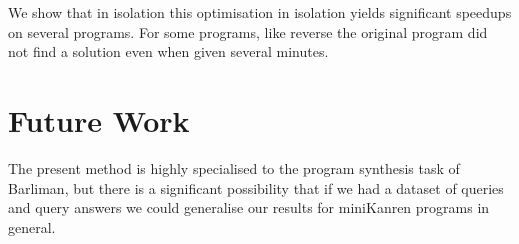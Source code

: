 \documentclass[submission,copyright,creativecommons]{eptcs}
\begin{document}
We show that in isolation this optimisation in isolation yields
significant speedups on several programs. For some programs, like
reverse the original program did not find a solution even when given
several minutes.

\section{Future Work}

The present method is highly specialised to the program synthesis task
of Barliman, but there is a significant possibility that if we had a
dataset of queries and query answers we could generalise our results
for miniKanren programs in general.



\end{document}
